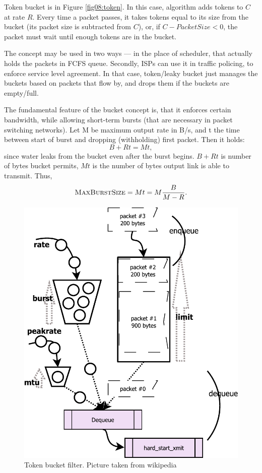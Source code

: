 Token bucket is in Figure \ref{fig08:token}. In this case, algorithm adds tokens to $C$ at rate $R$. Every time a packet passes, it takes tokens equal to its size from the bucket (its packet size is subtracted from $C$), or, if $C - PacketSize < 0$, the packet must wait until enough tokens are in the bucket. 

The concept may be used in two ways --- in the place of scheduler, that actually holds the packets in FCFS queue. Secondly, ISPs can use it in traffic policing, to enforce service level agreement. In that case, token/leaky bucket just manages the buckets based on packets that flow by, and drops them if the buckets are empty/full.

The fundamental feature of the bucket concept is, that it enforces certain bandwidth, while allowing short-term bursts (that are necessary in packet switching networks). Let M be maximum output rate in B/s, and t the time between start of burst and dropping (withholding) first packet. Then it holds:
\[
	B + Rt = Mt,
\]
since water leaks from the bucket even after the burst begins. $B + Rt$ is number of bytes bucket permits, $Mt$ is the number of bytes output link is able to transmit. Thus,
\[
	\textsc{MaxBurstSize} = Mt = M\frac{B}{M - R}.
\]

\begin{figure}
	\centering
	\includegraphics[width=.8\linewidth]{drawings/tbf}
	\caption{Token bucket filter. Picture taken from wikipedia \cite{TBF:picture}}
	
	\label{fig09:tbf}
\end{figure}

